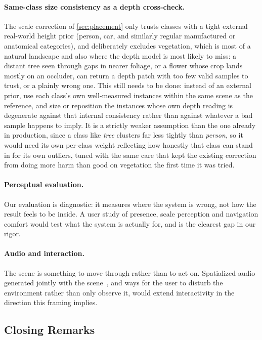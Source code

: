 \paragraph{Same-class size consistency as a depth cross-check.} The scale
correction of \cref{sec:placement} only trusts classes with a tight external
real-world height prior (person, car, and similarly regular manufactured or
anatomical categories), and deliberately excludes vegetation, which is most of a
natural landscape and also where the depth model is most likely to miss: a
distant tree seen through gaps in nearer foliage, or a flower whose crop lands
mostly on an occluder, can return a depth patch with too few valid samples to
trust, or a plainly wrong one. This still needs to be done: instead of an external
prior, use each class's own well-measured instances within the same scene as the
reference, and size or reposition the instances whose own depth reading is
degenerate against that internal consistency rather than against whatever a bad
sample happens to imply. It is a strictly weaker assumption than the one already
in production, since a class like \emph{tree} clusters far less tightly than
\emph{person}, so it would need its own per-class weight reflecting how honestly
that class can stand in for its own outliers, tuned with the same care that kept
the existing correction from doing more harm than good on vegetation the first
time it was tried.

\paragraph{Perceptual evaluation.} Our evaluation is diagnostic: it measures where
the system is wrong, not how the result feels to be inside. A user study of
presence, scale perception and navigation comfort would test what the system is
actually for, and is the clearest gap in our rigor.

\paragraph{Audio and interaction.} The scene is something to move through rather
than to act on. Spatialized audio generated jointly with the
scene~\cite{jin2026sonoworld}, and ways for the user to disturb the environment
rather than only observe it, would extend interactivity in the direction this
framing implies.

\subsection{Closing Remarks}

